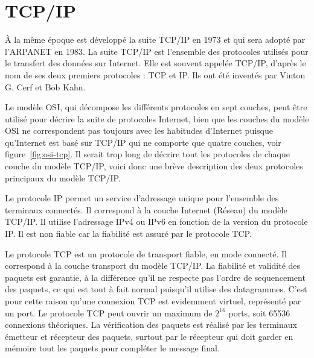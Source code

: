 \documentclass[12pt]{report}
\begin{document}
\section{TCP/IP}

À la même époque est développé la suite TCP/IP en 1973 et qui sera adopté par l'\gls{ARPANET} en 1983. La suite TCP/IP est l'ensemble des protocoles utilisés pour le transfert des données sur Internet. Elle est souvent appelée TCP/IP, d'après le nom de ses deux premiers protocoles : \gls{TCP} et \gls{IP}. Ils ont été inventés par Vinton G. Cerf et Bob Kahn.

Le modèle OSI, qui décompose les différents protocoles en sept couches, peut être utilisé pour décrire la suite de protocoles Internet, bien que les couches du modèle OSI ne correspondent pas toujours avec les habitudes d'Internet puisque qu'Internet est basé sur TCP/IP qui ne comporte que quatre couches, voir figure~\ref{fig:osi-tcp}. Il serait trop long de décrire tout les protocoles de chaque couche du modèle TCP/IP, voici donc une brève description des deux protocoles principaux du modèle TCP/IP\cite{wikitcpip}.

Le protocole IP permet un service d'adressage unique pour l'ensemble des terminaux connectés. Il correspond à la couche Internet (Réseau) du modèle TCP/IP. Il utilise l'adressage IPv4 ou IPv6 en fonction de la version du protocole IP. Il est \fg non fiable \og car la fiabilité est assuré par le protocole TCP\cite{wikiip}.

Le protocole TCP est un protocole de transport fiable, en mode connecté. Il correspond à la couche transport du modèle TCP/IP. La fiabilité et validité des paquets est garantie, à la différence qu'il ne respecte pas l'ordre de sequencement des paquets, ce qui est tout à fait normal puisqu'il utilise des datagrammes. C'est pour cette raison qu'une connexion TCP est evidemment virtuel, représenté par un port. Le protocole TCP peut ouvrir un maximum de $2^{16}$ ports, soit 65536 connexions théoriques. La vérification des paquets est réalisé par les terminaux émetteur et récepteur des paquets, surtout par le récepteur qui doit garder en mémoire tout les paquets pour compléter le message final\cite{wikitcp}.
\end{document}
